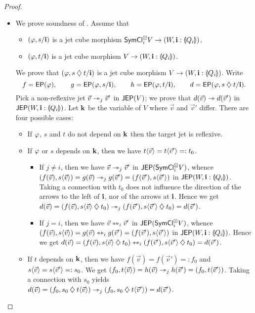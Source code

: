 \documentclass[a4paper]{memoir}
\begin{document}
\begin{proof}
\begin{itemize}
		\item We prove soundness of .
		Assume that
		\begin{itemize}
			\item $(\varphi, s / \mathbf{i})$ is a jet cube morphism $\mathsf{SymCl}^\boxdot_i V \to (W, \mathbf{i} : {\llparenthesis Q_i \rrparenthesis})$,
			\item $(\varphi, t / \mathbf{i})$ is a jet cube morphism $V \to (W, \mathbf{i} : {\llparenthesis Q_i \rrparenthesis})$.
		\end{itemize}
		We prove that $(\varphi, s \mathbin{\diamondsuit} t / \mathbf{i})$ is a jet cube morphism $V \to (W, \mathbf{i} : {\llparenthesis Q_i \rrparenthesis})$.
		Write
		\[
			f = \mathsf{EP}(\varphi), \qquad
			g = \mathsf{EP}(\varphi, s / \mathbf{i}), \qquad
			h = \mathsf{EP}(\varphi, t / \mathbf{i}), \qquad
			d = \mathsf{EP}(\varphi, s \mathbin{\diamondsuit} t / \mathbf{i}).
		\]
		Pick a non-reflexive jet $\vec v \rightarrowtriangle_j \vec v'$ in $\mathsf{JEP}(V)$; we prove that $d(\vec v) \rightarrowtriangle d(\vec v')$ in $\mathsf{JEP}(W, \mathbf{i} : {\llparenthesis Q_i \rrparenthesis})$.
		Let $\mathbf{k}$ be the variable of $V$ where $\vec v$ and $\vec v'$ differ.
		There are four possible cases:
		\begin{itemize}
			\item If $\varphi$, $s$ and $t$ do not depend on $\mathbf{k}$ then the target jet is reflexive.
			\item If $\varphi$ or $s$ depends on $\mathbf{k}$, then we have $t \langle \vec v \rangle = t \langle \vec v' \rangle =: t_0$.
			\begin{itemize}
				\item If $j \neq i$, then we have $\vec v \rightarrowtriangle_j \vec v'$ in $\mathsf{JEP}(\mathsf{SymCl}^\boxdot_i V)$, whence $(f(\vec v), s\langle \vec v \rangle) = g(\vec v) \rightarrowtriangle_j g(\vec v') = (f(\vec v'), s\langle \vec v' \rangle)$ in $\mathsf{JEP}(W, \mathbf{i} : {\llparenthesis Q_i \rrparenthesis})$.
				Taking a connection with $t_0$ does not influence the direction of the arrows to the left of $\mathbf{i}$, nor of the arrows at $\mathbf{i}$.
				Hence we get $d(\vec v) = (f(\vec v), s\langle \vec v \rangle \mathbin{\diamondsuit} t_0) \rightarrowtriangle_j (f(\vec v'), s\langle \vec v' \rangle \mathbin{\diamondsuit} t_0) = d(\vec v')$.
				
				\item If $j = i$, then we have $\vec v \leftrightarrowtriangle_i \vec v'$ in $\mathsf{JEP}(\mathsf{SymCl}^\boxdot_i V)$, whence $(f(\vec v), s\langle \vec v \rangle) = g(\vec v) \leftrightarrowtriangle_i g(\vec v') = (f(\vec v'), s\langle \vec v' \rangle)$ in $\mathsf{JEP}(W, \mathbf{i} : {\llparenthesis Q_i \rrparenthesis})$.
				Hence we get $d(\vec v) = (f(\vec v), s\langle \vec v \rangle \mathbin{\diamondsuit} t_0) \leftrightarrowtriangle_i (f(\vec v'), s\langle \vec v' \rangle \mathbin{\diamondsuit} t_0) = d(\vec v')$.
			\end{itemize}
			\item If $t$ depends on $\mathbf{k}$, then we have $f(\vec v) = f(\vec v') = : f_0$ and $s \langle \vec v \rangle = s \langle \vec v' \rangle =: s_0$.
			We get $(f_0, t \langle \vec v \rangle) = h(\vec v) \rightarrowtriangle_j h(\vec v') = (f_0, t \langle \vec v' \rangle)$.
			Taking a connection with $s_0$ yields $d(\vec v) = (f_0, s_0 \mathbin{\diamondsuit} t \langle \vec v \rangle) \rightarrowtriangle_j (f_0, s_0 \mathbin{\diamondsuit} t \langle \vec v' \rangle) = d(\vec v')$. \qedhere
		\end{itemize}
		

\end{itemize}
\end{proof}
\end{document}
